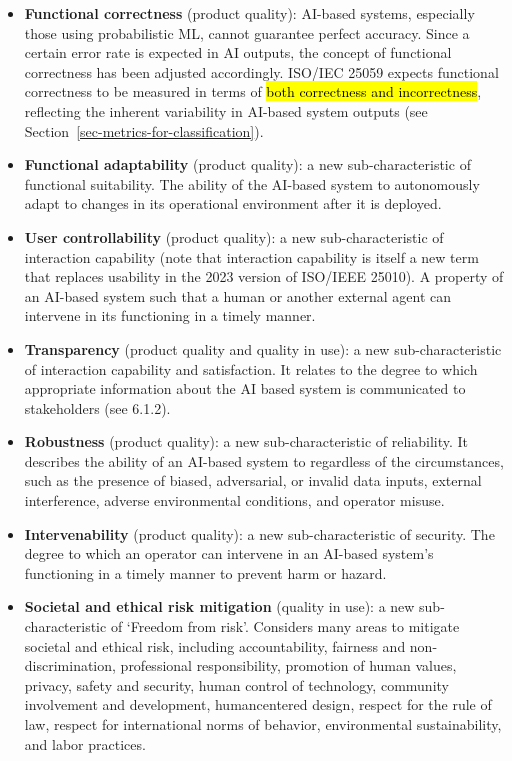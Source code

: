 \documentclass[
  letterpaper,
  DIV=11,
  numbers=noendperiod,
  oneside]{scrreprt}
\begin{document}
\begin{tcolorbox}
\begin{itemize}
\item
  \textbf{Functional correctness} (product quality): AI-based systems,
  especially those using probabilistic ML, cannot guarantee perfect
  accuracy. Since a certain error rate is expected in AI outputs, the
  concept of functional correctness has been adjusted accordingly.
  ISO/IEC 25059 expects functional correctness to be measured in terms
  of \hl{both correctness and incorrectness}, reflecting the inherent
  variability in AI-based system outputs (see
  Section~\ref{sec-metrics-for-classification}).
\item
  \textbf{Functional adaptability} (product quality): a new
  sub-characteristic of functional suitability. The ability of the
  AI-based system to autonomously adapt to changes in its operational
  environment after it is deployed.
\item
  \textbf{User controllability} (product quality): a new
  sub-characteristic of interaction capability (note that interaction
  capability is itself a new term that replaces usability in the 2023
  version of ISO/IEEE 25010). A property of an AI-based system such that
  a human or another external agent can intervene in its functioning in
  a timely manner.
\item
  \textbf{Transparency} (product quality and quality in use): a new
  sub-characteristic of interaction capability and satisfaction. It
  relates to the degree to which appropriate information about the AI
  based system is communicated to stakeholders (see 6.1.2).
\item
  \textbf{Robustness} (product quality): a new sub-characteristic of
  reliability. It describes the ability of an AI-based system to
  regardless of the circumstances, such as the presence of biased,
  adversarial, or invalid data inputs, external interference, adverse
  environmental conditions, and operator misuse.
\item
  \textbf{Intervenability} (product quality): a new sub-characteristic
  of security. The degree to which an operator can intervene in an
  AI-based system's functioning in a timely manner to prevent harm or
  hazard.
\item
  \textbf{Societal and ethical risk mitigation} (quality in use): a new
  sub-characteristic of `Freedom from risk'. Considers many areas to
  mitigate societal and ethical risk, including accountability, fairness
  and non-discrimination, professional responsibility, promotion of
  human values, privacy, safety and security, human control of
  technology, community involvement and development, humancentered
  design, respect for the rule of law, respect for international norms
  of behavior, environmental sustainability, and labor practices.
\end{itemize}


\end{tcolorbox}
\end{document}
